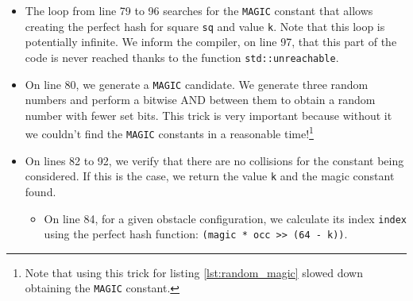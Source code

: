 \documentclass[12pt,a4paper,twoside,openright]{book}
\begin{document}
\begin{itemize}
\begin{itemize}
\item The loop from line 79 to 96 searches for the \texttt{MAGIC} constant that allows creating the perfect hash for square \texttt{sq} and value \texttt{k}. Note that this loop is potentially infinite. We inform the compiler, on line 97, that this part of the code is never reached thanks to the function \texttt{std::unreachable}.

\item On line 80, we generate a \texttt{MAGIC} candidate. We generate three random numbers and perform a bitwise AND between them to obtain a random number with fewer set bits. This trick is very important because without it we couldn't find the \texttt{MAGIC} constants in a reasonable time!\footnote{Note that using this trick for listing \ref{lst:random_magic} slowed down obtaining the \texttt{MAGIC} constant.}

\item On lines 82 to 92, we verify that there are no collisions for the constant being considered. If this is the case, we return the value \texttt{k} and the magic constant found.

\begin{itemize}
\item On line 84, for a given obstacle configuration, we calculate its index \texttt{index} using the perfect hash function: \texttt{(magic * occ >> (64 - k))}.


\end{itemize}
\end{itemize}
\end{itemize}
\end{document}
